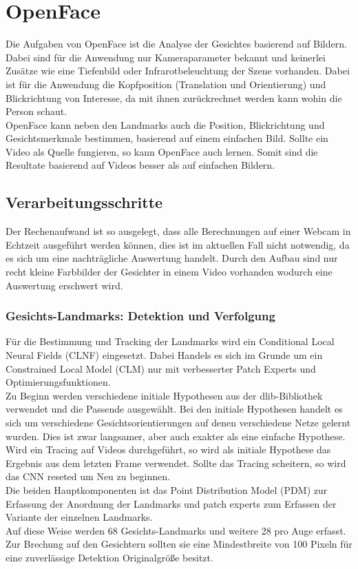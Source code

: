 \section{OpenFace}
Die Aufgaben von OpenFace ist die Analyse der Gesichtes basierend auf Bildern. Dabei sind für die Anwendung nur Kameraparameter bekannt und keinerlei Zusätze wie eine Tiefenbild oder Infrarotbeleuchtung der Szene vorhanden. Dabei ist für die Anwendung die Kopfposition (Translation und Orientierung) und Blickrichtung von Interesse, da mit ihnen zurückrechnet werden kann wohin die Person schaut.\\
OpenFace kann neben den Landmarks auch die Position, Blickrichtung und Gesichtsmerkmale bestimmen, basierend auf einem einfachen Bild. Sollte ein Video als Quelle fungieren, so kann OpenFace auch lernen. Somit sind die Resultate basierend auf Videos besser als auf einfachen Bildern.
\subsection{Verarbeitungsschritte}
Der Rechenaufwand ist so ausgelegt, dass alle Berechnungen auf einer Webcam in Echtzeit ausgeführt werden können, dies ist im aktuellen Fall nicht notwendig, da es sich um eine nachträgliche Auswertung handelt. Durch den Aufbau sind nur recht kleine Farbbilder der Gesichter in einem Video vorhanden wodurch eine Auswertung erschwert wird.
\subsubsection{Gesichts-Landmarks: Detektion und Verfolgung}
Für die Bestimmung und Tracking der Landmarks wird ein Conditional Local Neural Fields (CLNF) eingesetzt. Dabei Handels es sich im Grunde um ein Constrained Local Model (CLM) nur mit verbesserter Patch Experts und Optimierungsfunktionen.\\
Zu Beginn werden verschiedene initiale Hypothesen aus der dlib-Bibliothek verwendet und die Passende ausgewählt. Bei den initiale Hypothesen handelt es sich um verschiedene Gesichtsorientierungen auf denen verschiedene Netze gelernt wurden. Dies ist zwar langsamer, aber auch exakter als eine einfache Hypothese. Wird ein Tracing auf Videos durchgeführt, so wird als initiale Hypothese das Ergebnis aus dem letzten Frame verwendet. Sollte das Tracing scheitern, so wird das CNN reseted um Neu zu beginnen.\\
Die beiden Hauptkomponenten ist das Point Distribution Model (PDM) zur Erfassung der Anordnung der Landmarks und patch experts zum Erfassen der Variante der einzelnen Landmarks.\\
Auf diese Weise werden 68 Gesichts-Landmarks und  weitere 28 pro Auge erfasst. Zur Brechung auf den Gesichtern sollten sie eine Mindestbreite von 100 Pixeln für eine zuverlässige Detektion Originalgröße besitzt.
